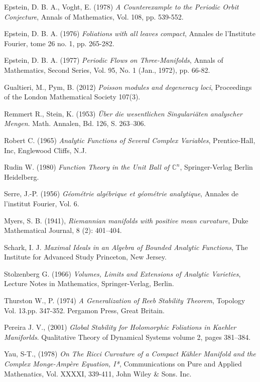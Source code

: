 \documentclass{article}
\newcommand{\con}{\ensuremath{\mathbb{C}^n}}
\begin{document}
\begin{thebibliography}{3}
 Epstein, D. B. A., Voght, E. (1978) \textit{A Counterexample to the Periodic Orbit Conjecture}, 
Annals of Mathematics, Vol. 108, pp. 539-552. 

 Epstein, D. B. A. (1976) \textit{Foliations with all leaves compact}, Annales de l'Institute Fourier, 
tome 26 no. 1, pp. 265-282.

 Epstein, D. B. A. (1977) \textit{Periodic Flows on Three-Manifolds}, Annals of Mathematics, 
Second Series, Vol. 95, No. 1 (Jan., 1972), pp. 66-82.

 Gualtieri, M., Pym, B. (2012) \textit{Poisson modules and degeneracy loci},
Proceedings of the London Mathematical Society 107(3).

 Remmert R., Stein, K. (1953) \textit{Über die wesentlichen
Singulariäten analyscher Mengen}. Math. Annalen, Bd. 126, S. 263--306.

 Robert C. (1965) \textit{Analytic Functions of Several
Complex Variables}, Prentice-Hall, Inc, Englewood Cliffs, N.J.

 Rudin W. (1980) \textit{Function Theory in the Unit Ball of
$\con$}, Springer-Verlag Berlin Heidelberg.

 Serre, J.-P. (1956) \textit{G\'eom\'etrie alg\'ebrique et
g\'eom\'etrie analytique}, Annales de l'institut Fourier, Vol. 6. 

 Myers, S. B. (1941), \textit{Riemannian manifolds with positive mean curvature}, Duke Mathematical Journal, 
8 (2): 401–404.

 Schark, I. J. \textit{Maximal Ideals in an Algebra of Bounded Analytic Functions}, The Institute for Advanced Study
Princeton, New Jersey.

 Stolzenberg G. (1966) \textit{Volumes, Limits and
Extensions of Analytic Varieties}, Lecture Notes in Mathematics,
Springer-Verlag, Berlin. 

 Thurston W., P. (1974) \textit{A Generalization of Reeb Stability Theorem}, Topology Vol. 13.pp. 347-352.
Pergamon Press, Great Britain.

 Pereira J. V., (2001) \textit{Global Stability for Holomorphic Foliations in Kaehler Maniforlds}. 
Qualitative Theory of Dynamical Systems volume 2, pages 381–384.

 Yau, S-T., (1978) \textit{On The Ricci Curvature of a Compact K\"ahler Manifold and the Complex Monge-Amp\`ere Equation, I*},
Communications on Pure and Applied Mathenatics, Vol. XXXXI, 339-411, John Wiley \& Sons. Inc.
\end{thebibliography}
\end{document}

